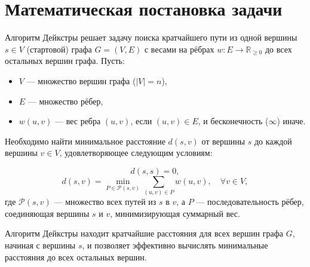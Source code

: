\section{Математическая постановка задачи}

Алгоритм Дейкстры решает задачу поиска кратчайшего пути из одной вершины \(s \in V\) (стартовой) графа \(G = (V, E)\) с весами на рёбрах \(w : E \to \mathbb{R}_{\geq 0}\) до всех остальных вершин графа. Пусть:

\begin{itemize}
    \item \(V\) — множество вершин графа (\(|V| = n\)),
    \item \(E\) — множество рёбер,
    \item \(w(u, v)\) — вес ребра \((u, v)\), если \((u, v) \in E\), и бесконечность (\(\infty\)) иначе.
\end{itemize}

Необходимо найти минимальное расстояние \(d(s, v)\) от вершины \(s\) до каждой вершины \(v \in V\), удовлетворяющее следующим условиям:

\[
d(s, s) = 0,
\]
\[
d(s, v) = \min_{P \in \mathcal{P}(s, v)} \sum_{(u, v) \in P} w(u, v), \quad \forall v \in V,
\]
где \(\mathcal{P}(s, v)\) — множество всех путей из \(s\) в \(v\), а \(P\) — последовательность рёбер, соединяющая вершины \(s\) и \(v\), минимизирующая суммарный вес. 

Алгоритм Дейкстры находит кратчайшие расстояния для всех вершин графа \(G\), начиная с вершины \(s\), и позволяет эффективно вычислять минимальные расстояния до всех остальных вершин.
